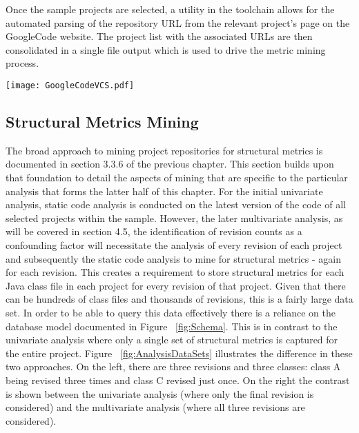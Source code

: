 Once the sample projects are selected, a utility in the toolchain allows for the automated parsing of the repository URL from the relevant project's page on the GoogleCode website. The project list with the associated URLs are then consolidated in a single file output which is used to drive the metric mining process.

\begin{table}
\centering 
{}
\begin{tabular}
 \centering 
 \texttt{[image: GoogleCodeVCS.pdf]}
 \label{tab:GoogleCodeVCS}
\end{tabular}
\end{table}


\subsection{Structural Metrics Mining}
The broad approach to mining project repositories for structural metrics is documented in section 3.3.6 of the previous chapter. This section builds upon that foundation to detail the aspects of mining that are specific to the particular analysis that forms the latter half of this chapter. For the initial univariate analysis, static code analysis is conducted on the latest version of the code of all selected projects within the sample. However, the later multivariate analysis, as will be covered in section 4.5, the identification of revision counts as a confounding factor will necessitate the analysis of every revision of each project and subsequently the static code analysis to mine for structural metrics - again for each revision. This creates a requirement to store structural metrics for each Java class file in each project for every revision of that project. Given that there can be hundreds of class files and thousands of revisions, this is a fairly large data set. In order to be able to query this data effectively there is a reliance on the database model documented in Figure ~\ref{fig:Schema}. This is in contrast to the univariate analysis where only a single set of structural metrics is captured for the entire project. Figure ~\ref{fig:AnalysisDataSets} illustrates the difference in these two approaches. On the left, there are three revisions and three classes: class A being revised three times and class C revised just once. On the right the contrast is shown between the univariate analysis (where only the final revision is considered) and the multivariate analysis (where all three revisions are considered).

